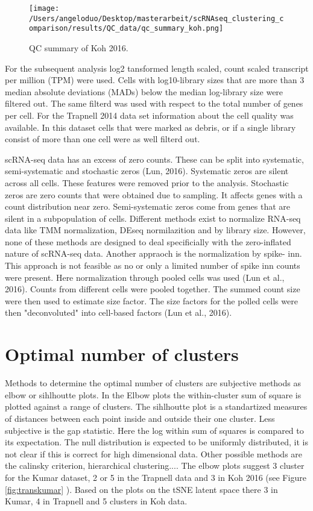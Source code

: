 \documentclass{article}\usepackage[]{graphicx}\usepackage[]{color}
\begin{document}
\begin{figure}[!h]
\texttt{[image: /Users/angeloduo/Desktop/masterarbeit/scRNAseq\_clustering\_comparison/results/QC\_data/qc\_summary\_koh.png]}
\caption{QC summary of Koh 2016. }
\label{fig:qckoh}
\end{figure}


For the subsequent analysis log2 tansformed length scaled, count scaled transcript per million (TPM) were used. 
Cells with log10-library sizes that are more than 3 median absolute deviations (MADs) below the median log-library size were filtered out. The same filterd was used with respect to the total number of genes per cell. 
For the Trapnell 2014 data set information about the cell quality was available. In this dataset cells that were marked as debris, or if a single library consist of more than one cell were as well filterd out. 

scRNA-seq data has an excess of zero counts. These can be split into systematic, semi-systematic and stochastic zeros (Lun, 2016). Systematic zeros are silent across all cells. These features were removed prior to the analysis. Stochastic zeros are zero counts that were obtained due to sampling. It affects genes with a count distribution near zero. Semi-systematic zeros come from genes that are silent in a subpopulation of cells. Different methods exist to normalize RNA-seq data like TMM normalization, DEseq normilazition and by library size. However, none of these methods are designed to deal specificially with the zero-inflated nature of scRNA-seq data.
Another appraoch is the normalization by spike- inn. This approach is not feasible as no or only a limited number of  spike inn counts were present.  Here normalization through pooled cells was used (Lun et al., 2016). Counts from different cells were pooled together. The summed count size were then used to estimate size factor. The size factors for the polled cells were then  "deconvoluted" into cell-based factors (Lun et al., 2016). 
\section{Optimal number of clusters}
Methods to determine the optimal number of clusters are subjective methods as elbow or sihlhoutte plots. In the Elbow plots the within-cluster sum of square is plotted against a range of clusters. The sihlhoutte plot is a standartized measures of distances between each point inside and outside their one cluster. Less subjective is the gap statistic. Here the log within sum of squares is compared to its expectation. The null distribution is expected to be uniformly distributed, it is not clear if this is correct for high dimensional data. Other possible methods are the calinsky criterion, hierarchical clustering....
The elbow plots suggest 3 cluster for the Kumar dataset, 2 or 5 in the Trapnell data and 3  in Koh 2016 (see Figure \ref{fig:transkumar} ). Based on the plots on the tSNE latent space there 3 in Kumar, 4 in Trapnell and 5 clusters in Koh data.
\end{document}
